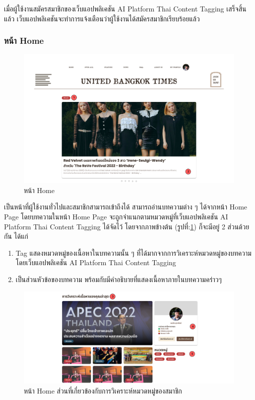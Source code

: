 \documentclass[12pt,oneside,openright,a4paper]{cpe-thai-project}
\begin{document}
\hspace*{1cm}เมื่อผู้ใช้งานสมัครสมาชิกของเว็บแอปพลิเคชัน AI Platform Thai Content Tagging เสร็จสิ้นแล้ว 
เว็บแอปพลิเคชันจะทำการแจ้งเตือนว่าผู้ใช้งานได้สมัครสมาชิกเรียบร้อยแล้ว

\subsubsection{หน้า Home}
\begin{figure}[!ht]\centering
  \includegraphics[width=15cm]{./img/project_ui/homepage2.png} 
  \caption{หน้า Home}\label{fig:homepage} 
\end{figure}
\hspace*{1cm}เป็นหน้าที่ผู้ใช้งานทั่วไปและสมาชิกสามารถเข้าถึงได้ สามารถอ่านบทความต่าง ๆ ได้จากหน้า Home Page 
โดยบทความในหน้า Home Page จะถูกจำแนกตามหมวดหมู่ที่เว็บแอปพลิเคชัน AI Platform Thai Content Tagging ได้จัดไว้ \newpage
โดยจากภาพข้างต้น (รูปที่:\ref{fig:homepage}) ก็จะมีอยู่ 2 ส่วนด้วยกัน ได้แก่
\begin{enumerate}
  \item Tag แสดงหมวดหมู่ของเนื้อหาในบทความนั้น ๆ ที่ได้มากจากการวิเคราะห์หมวดหมู่ของบทความโดยเว็บแอปพลิเคชัน AI Platform Thai Content Tagging
  \item เป็นส่วนหัวข้อของบทความ พร้อมกับมีคำอธิบายที่แสดงเนื้อหาภายในบทความคร่าวๆ
\end{enumerate}
\begin{figure}[!ht]\centering
  \includegraphics[width=14cm]{./img/project_ui/homepage3.png} 
  \caption{หน้า Home ส่วนที่เกี่ยวข้องกับการวิเคราะห์หมวดหมู่ของสมาชิก}\label{fig:homepage2} 
\end{figure}
\end{document}
